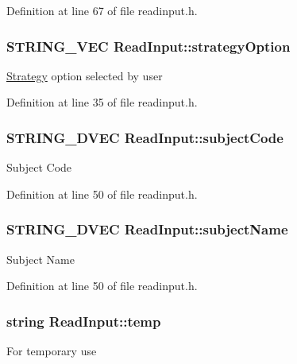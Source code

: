 Definition at line 67 of file readinput.\-h.

\hypertarget{classReadInput_a0f62d76d15b123767751a22f87dc79ed}{
\subsubsection[{strategy\-Option}]{\setlength{\rightskip}{0pt plus 5cm}S\-T\-R\-I\-N\-G\-\_\-\-V\-E\-C Read\-Input\-::strategy\-Option\hspace{0.3cm}{\ttfamily [protected]}}}\label{classReadInput_a0f62d76d15b123767751a22f87dc79ed}
\hyperlink{classStrategy}{Strategy} option selected by user 

Definition at line 35 of file readinput.\-h.

\hypertarget{classReadInput_a5db96d61a79c6a36bcdc4907bebf8bd0}{
\subsubsection[{subject\-Code}]{\setlength{\rightskip}{0pt plus 5cm}S\-T\-R\-I\-N\-G\-\_\-D\-V\-E\-C Read\-Input\-::subject\-Code\hspace{0.3cm}{\ttfamily [protected]}}}\label{classReadInput_a5db96d61a79c6a36bcdc4907bebf8bd0}
Subject Code 

Definition at line 50 of file readinput.\-h.

\hypertarget{classReadInput_acbd2ac53fb64da88965fa5e542f2c456}{
\subsubsection[{subject\-Name}]{\setlength{\rightskip}{0pt plus 5cm}S\-T\-R\-I\-N\-G\-\_\-D\-V\-E\-C Read\-Input\-::subject\-Name\hspace{0.3cm}{\ttfamily [protected]}}}\label{classReadInput_acbd2ac53fb64da88965fa5e542f2c456}
Subject Name 

Definition at line 50 of file readinput.\-h.

\hypertarget{classReadInput_ab10b4c63b69664f292d1c66028618008}{
\subsubsection[{temp}]{\setlength{\rightskip}{0pt plus 5cm}string Read\-Input\-::temp\hspace{0.3cm}{\ttfamily [protected]}}}\label{classReadInput_ab10b4c63b69664f292d1c66028618008}
For temporary use 


